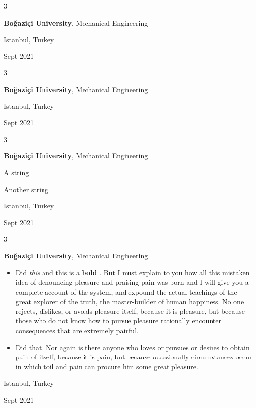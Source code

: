 \documentclass[10pt, letterpaper]{article}
\newenvironment{summary}{
    \begin{description}[
        topsep=0.10 cm,
        parsep=0.10 cm,
        partopsep=0pt,
        itemsep=0pt,
        leftmargin=0.4 cm + 10pt
    ]
}{
    \end{description}
} %
\newenvironment{highlights}{
    \begin{itemize}[
        topsep=0.10 cm,
        parsep=0.10 cm,
        partopsep=0pt,
        itemsep=0pt,
        leftmargin=0.4 cm + 10pt
    ]
}{
    \end{itemize}
} %
\newenvironment{threecolentry}[3][]{
    \onecolentry
    \def\thirdColumn{#3}
    \setcolumnwidth{1 cm, \fill, 4.5 cm}
    \begin{paracol}{3}
    {\raggedright #2} \switchcolumn
}{
    \switchcolumn \raggedleft \thirdColumn
    \end{paracol}
    \endonecolentry
} %
\let\hrefWithoutArrow\href
\renewcommand{\href}[2]{\hrefWithoutArrow{#1}{\ifthenelse{\equal{#2}{}}{ }{#2 }\raisebox{.15ex}{\footnotesize \faExternalLink*}}}
\begin{document}
        \vspace{0.2 cm}

        \begin{threecolentry}{\textbf{}}{
            Istanbul, Turkey

        Sept 2021
        }
            \textbf{Boğaziçi University}, Mechanical Engineering
        \end{threecolentry}

        \vspace{0.2 cm}

        \begin{threecolentry}{\textbf{}}{
            Istanbul, Turkey

        Sept 2021
        }
            \textbf{Boğaziçi University}, Mechanical Engineering
        \end{threecolentry}

        \vspace{0.2 cm}

        \begin{threecolentry}{\textbf{}}{
            Istanbul, Turkey

        Sept 2021
        }
            \textbf{Boğaziçi University}, Mechanical Engineering
            \begin{summary}
                \item A string
                \item Another string
            \end{summary}
        \end{threecolentry}

        \vspace{0.2 cm}

        \begin{threecolentry}{\textbf{}}{
            Istanbul, Turkey

        Sept 2021
        }
            \textbf{Boğaziçi University}, Mechanical Engineering
            \begin{highlights}
                \item Did \textit{this} and this is a \textbf{bold} \href{https://example.com}{link}. But I must explain to you how all this mistaken idea of denouncing pleasure and praising pain was born and I will give you a complete account of the system, and expound the actual teachings of the great explorer of the truth, the master-builder of human happiness. No one rejects, dislikes, or avoids pleasure itself, because it is pleasure, but because those who do not know how to pursue pleasure rationally encounter consequences that are extremely painful.
                \item Did that. Nor again is there anyone who loves or pursues or desires to obtain pain of itself, because it is pain, but because occasionally circumstances occur in which toil and pain can procure him some great pleasure.
            \end{highlights}
        \end{threecolentry}
\end{document}
